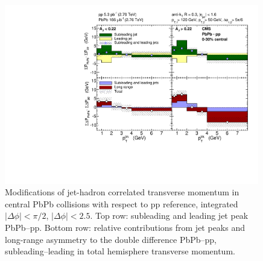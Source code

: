 \begin{figure}[hbt]
\begin{center} 
\includegraphics[width=0.99\textwidth]{figures/Results/Integral_PbPb_pp_Summary.pdf}
\caption[Relative contributions from jet peaks and long-range asymmetry to the double difference PbPb--pp, subleading--leading in total hemisphere transverse momentum for central collisions]{Modifications of jet-hadron correlated transverse momentum in central PbPb collisions with respect to pp reference, integrated $|\Delta\phi| < \pi/2$, $|\Delta\phi| < 2.5$.  Top row:  subleading and leading jet peak PbPb--pp.  Bottom row:  relative contributions from jet peaks and long-range asymmetry to the double difference PbPb--pp, subleading--leading in total hemisphere transverse momentum. }
\label{fig:Integral_Summary} 
\end{center} 
\end{figure} 



